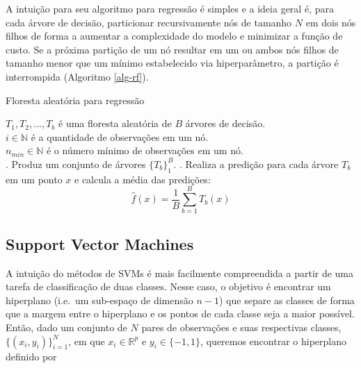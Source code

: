 \begin{apendicesenv}
A intuição para seu algoritmo para regressão é simples e a ideia geral
é, para cada árvore de decisão, particionar recursivamente nós de
tamanho \(N\) em dois nós filhos de forma a aumentar a complexidade do
modelo e minimizar a função de custo. Se a próxima partição de um nó
resultar em um ou ambos nós filhos de tamanho menor que um mínimo
estabelecido via hiperparâmetro, a partição é interrompida (Algoritmo
\ref{alg-rf}).

\begin{algorithm}
\caption{Floresta aleatória para regressão}\label{alg-rf}

${T_1, T_2, ..., T_b}$ é uma floresta aleatória de $B$ árvores de decisão. \\
\BlankLine
$i \in \mathbb{N}$ é a quantidade de observações em um nó. \\
\BlankLine
$n_{min} \in \mathbb{N}$ é o número mínimo de observações em um nó. \\
\BlankLine
{}
. Produz um conjunto de árvores $\{T_b\}_1^B$.
. Realiza a predição para cada árvore $T_b$ em um ponto $x$ e calcula a média das predições:
$$\hat{f}(x) = \frac{1}{B}\sum_{b=1}^B T_b(x)$$

\end{algorithm}

\subsection{Support Vector Machines}\label{support-vector-machines}

A intuição do métodos de SVMs é mais facilmente compreendida a partir de
uma tarefa de classificação de duas classes. Nesse caso, o objetivo é
encontrar um hiperplano (i.e.~um sub-espaço de dimensão \(n-1\)) que
separe as classes de forma que a margem entre o hiperplano e os pontos
de cada classe seja a maior possível. Então, dado um conjunto de \(N\)
pares de observações e suas respectivas classes,
\(\{(x_i, y_i)\}_{i=1}^N\), em que \(x_i \in \mathbb{R}^p\) e
\(y_i \in \{-1, 1\}\), queremos encontrar o hiperplano definido por


\end{apendicesenv}
